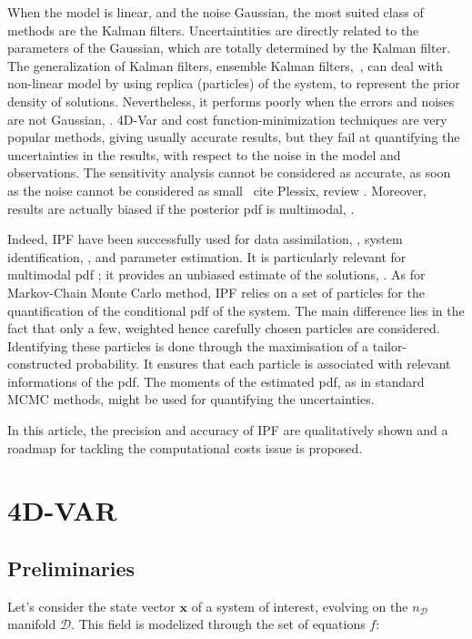 \documentclass[aip,pof,nofootinbib,reprint,onecolumn]{revtex4-1}
\newcommand{\todo}[1]{{\color{red} #1 }}
\newcommand{\gras}[1]{\boldsymbol{#1}}
\newcommand{\Ephaz}{\mathcal{D}}%
\newcommand{\Nphaz}{n_{\mathcal{D}}} %
\newcommand{\fdyn}{f} %
\newcommand{\point}{\gras{x}} %
\begin{document}
When the model is linear, and the noise Gaussian, the most suited class of methods are the Kalman filters. 
Uncertaintities are directly related to the parameters of the Gaussian, which are totally determined by the Kalman filter. 
The generalization of Kalman filters, ensemble Kalman filters,~\cite{Evensen2009}, can deal with non-linear model by using replica (particles) of the system, to represent the prior density of solutions. 
Nevertheless, it performs poorly when the errors and noises are not Gaussian, \cite{Miller1999}. 
4D-Var and cost function-minimization techniques are very popular methods, giving usually accurate results, but they fail at quantifying the uncertainties in the results, with respect to the noise in the model and observations. 
The sensitivity analysis cannot be considered as accurate, as soon as the noise cannot be considered as small~\todo{cite Plessix, review}.
Moreover, results are actually biased if the posterior pdf is multimodal, \cite{Rabier1992}.

Indeed, IPF have been successfully used for data assimilation, \cite{Chorin2010}, system identification, \cite{Morzfeld2012}, and parameter estimation. 
It is particularly relevant for multimodal pdf ; it provides an unbiased estimate of the solutions, \citep{Atkins2013}.
As for Markov-Chain Monte Carlo method, IPF relies on a set of particles for the quantification of the conditional pdf of the system.
The main difference lies in the fact that only a few, weighted hence carefully chosen particles are considered.  
Identifying these particles is done through the maximisation of a tailor-constructed probability.
It ensures that each particle is associated with relevant informations of the pdf. 
The moments of the estimated pdf, as in standard MCMC methods, might be used for quantifying the uncertainties.

In this article, the precision and accuracy of IPF are qualitatively shown
and a roadmap for tackling the computational costs issue is proposed.

\section{4D-VAR}
\subsection{Preliminaries}
Let's consider the state vector $\point$ of a system of interest, evolving on the $\Nphaz$ manifold $\Ephaz $. This field is modelized through the set of equations $\fdyn$:
\end{document}
